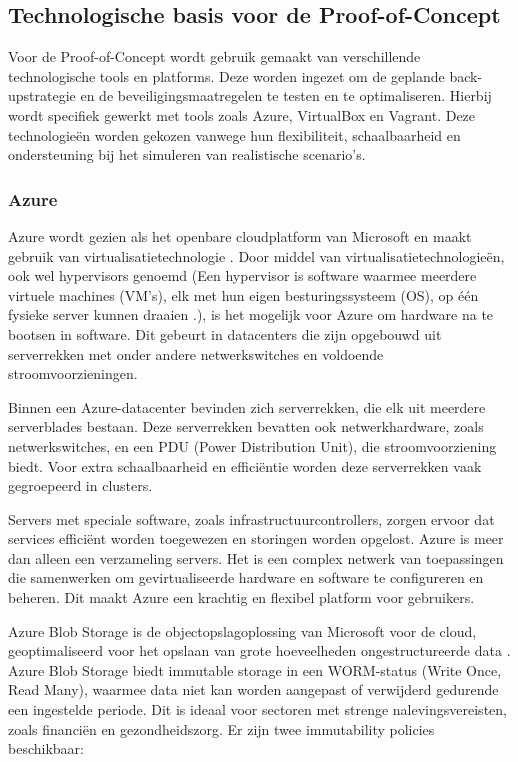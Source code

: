 \subsection{Technologische basis voor de Proof-of-Concept}
Voor de Proof-of-Concept wordt gebruik gemaakt van verschillende technologische tools en platforms. Deze worden ingezet om de geplande back-upstrategie en de beveiligingsmaatregelen te testen en te optimaliseren. Hierbij wordt specifiek gewerkt met tools zoals Azure, VirtualBox en Vagrant. Deze technologieën worden gekozen vanwege hun flexibiliteit, schaalbaarheid en ondersteuning bij het simuleren van realistische scenario's.
\subsubsection{Azure}
Azure wordt gezien als het openbare cloudplatform van Microsoft en maakt gebruik van virtualisatietechnologie \autocite{Ekuan2023}. Door middel van virtualisatietechnologieën, ook wel hypervisors genoemd (Een hypervisor is software waarmee meerdere virtuele machines (VM's), elk met hun eigen besturingssysteem (OS), op één fysieke server kunnen draaien \autocite{Susnjara2024}.), is het mogelijk voor Azure om hardware na te bootsen in software. Dit gebeurt in datacenters die zijn opgebouwd uit serverrekken met onder andere netwerkswitches en voldoende stroomvoorzieningen. 

Binnen een Azure-datacenter bevinden zich serverrekken, die elk uit meerdere serverblades bestaan. Deze serverrekken bevatten ook netwerkhardware, zoals netwerkswitches, en een PDU (Power Distribution Unit), die stroomvoorziening biedt. Voor extra schaalbaarheid en efficiëntie worden deze serverrekken vaak gegroepeerd in clusters. 

Servers met speciale software, zoals infrastructuurcontrollers, zorgen ervoor dat services efficiënt worden toegewezen en storingen worden opgelost. Azure is meer dan alleen een verzameling servers. Het is een complex netwerk van toepassingen die samenwerken om gevirtualiseerde hardware en software te configureren en beheren. Dit maakt Azure een krachtig en flexibel platform voor gebruikers.

Azure Blob Storage is de objectopslagoplossing van Microsoft voor de cloud, geoptimaliseerd voor het opslaan van grote hoeveelheden ongestructureerde data \autocite{Dubey2023}. Azure Blob Storage biedt immutable storage in een WORM-status (Write Once, Read Many), waarmee data niet kan worden aangepast of verwijderd gedurende een ingestelde periode. Dit is ideaal voor sectoren met strenge nalevingsvereisten, zoals financiën en gezondheidszorg.  Er zijn twee immutability policies beschikbaar:

